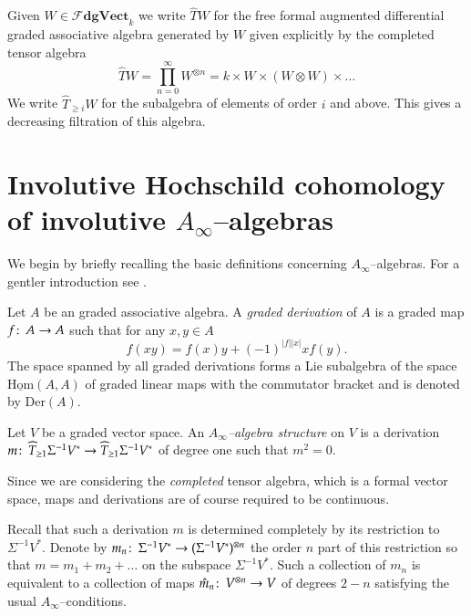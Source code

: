 \documentclass[british]{amsart}
\theoremstyle{plain}
\theoremstyle{definition}
{
\newaliascnt{{definition}}{theorem}\newtheorem{{definition}}[{definition}]{{Definition}}\aliascntresetthe{{definition}}\expandafterautorefname\endcsname{{Definition}}}
{
\newaliascnt{{remark}}{theorem}\newtheorem{{remark}}[{remark}]{{Remark}}\aliascntresetthe{{remark}}\expandafterautorefname\endcsname{{Remark}}}
{
\newaliascnt{{example}}{theorem}\newtheorem{{example}}[{example}]{{Example}}\aliascntresetthe{{example}}\expandafterautorefname\endcsname{{Example}}}
{
\newaliascnt{{examples}}{theorem}\newtheorem{{examples}}[{examples}]{{Examples}}\aliascntresetthe{{examples}}\expandafterautorefname\endcsname{{Examples}}}
{
\newaliascnt{{notation}}{theorem}\newtheorem{{notation}}[{notation}]{{Notation}}\aliascntresetthe{{notation}}\expandafterautorefname\endcsname{{Notation}}}
{
\newaliascnt{{convention}}{theorem}\newtheorem{{convention}}[{convention}]{{Convention}}\aliascntresetthe{{convention}}\expandafterautorefname\endcsname{{Convention}}}
\numberwithin{equation}{section}
\numberwithin{figure}{section}
\begin{document}
Given $W\in{\mathscr{F}{\mathbf{dgVect}_k}}$ we write $\widehat{T}W$ for the free formal augmented differential graded associative algebra generated by $W$ given explicitly by the completed tensor algebra
\[
\widehat{T}W = \prod_{n=0}^\infty W^{\otimes n} = k \times W \times (W\otimes W) \times \dots
\]
We write $\widehat{T}_{\geq i}W$ for the subalgebra of elements of order $i$ and above. This gives a decreasing filtration of this algebra.

\section{Involutive Hochschild cohomology of involutive \texorpdfstring{$A_\infty$--}{A-infinity }algebras}\label{sec:noncyc}
We begin by briefly recalling the basic definitions concerning $A_\infty$--algebras. For a gentler introduction see \cite{keller2001:introtoainfinity,keller2006:ainfinityalgebrasmodules}.

\begin{definition}
Let $A$ be an graded associative algebra. A \emph{graded derivation} of $A$ is a graded map $f{\colon\thinspace} A\rightarrow A$ such that for any $x,y\in A$
\[
f(xy) = f(x)y + (-1)^{{\lvert {f} \rvert}{\lvert {x} \rvert}}xf(y).
\]
The space spanned by all graded derivations forms a Lie subalgebra of the space $\operatorname{\underline{Hom}}(A,A)$ of graded linear maps with the commutator bracket and is denoted by ${\mathrm{Der}}(A)$.
\end{definition}

\begin{definition}
Let $V$ be a graded vector space. An \emph{$A_\infty$--algebra structure} on $V$ is a derivation $m{\colon\thinspace} \widehat{T}_{\geq 1}\Sigma^{-1}V^*\rightarrow \widehat{T}_{\geq 1}\Sigma^{-1}V^*$ of degree one such that $m^2 = 0$.
\end{definition}

\begin{remark}
Since we are considering the \emph{completed} tensor algebra, which is a formal vector space, maps and derivations are of course required to be continuous.
\end{remark}

Recall that such a derivation $m$ is determined completely by its restriction to $\Sigma^{-1}V^*$. Denote by $m_n{\colon\thinspace}\Sigma^{-1}V^*\rightarrow (\Sigma^{-1}V^*)^{\otimes n}$ the order $n$ part of this restriction so that $m = m_1 + m_2 + \dots$ on the subspace $\Sigma^{-1}V^*$. Such a collection of $m_n$ is equivalent to a collection of maps $\hat{m}_n{\colon\thinspace} V^{\otimes n} \rightarrow V$ of degrees $2-n$ satisfying the usual $A_\infty$--conditions.
\end{document}
